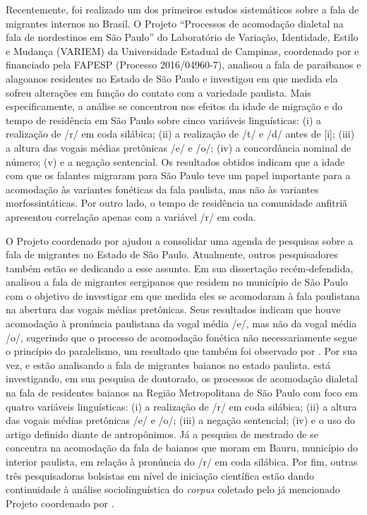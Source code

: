 \documentclass[
	a4paper,	%
	12pt,		%
	]{article}	%
\begin{document}
Recentemente, foi realizado um dos primeiros estudos sistemáticos sobre a fala
de migrantes internos no Brasil. O Projeto \enquote{Processos de acomodação
dialetal na fala de nordestinos em São Paulo} do Laboratório de Variação,
Identidade, Estilo e Mudança (VARIEM) da Universidade Estadual de Campinas,
coordenado por \citet{Oushiro2018} e financiado pela FAPESP (Processo
2016/04960-7), analisou a fala de paraibanos e alagoanos residentes no Estado de
São Paulo e investigou em que medida ela sofreu alterações em função do contato
com a variedade paulista.  Mais especificamente, a análise se concentrou nos
efeitos da idade de migração e do tempo de residência em São Paulo sobre cinco
variáveis linguísticas: (i) a realização de /r/ em coda silábica; (ii) a
realização de /t/ e /d/ antes de [i]; (iii) a altura das vogais médias
pretônicas /e/ e /o/; (iv) a concordância nominal de número; (v) e a negação
sentencial. Os resultados obtidos indicam que a idade com que os falantes
migraram para São Paulo teve um papel importante para a acomodação às variantes
fonéticas da fala paulista, mas não às variantes morfossintáticas. Por outro
lado, o tempo de residência na comunidade anfitriã apresentou correlação apenas
com a variável /r/ em coda.

O Projeto coordenado por \citet{Oushiro2018} ajudou a consolidar uma agenda
de pesquisas sobre a fala de migrantes no Estado de São Paulo. Atualmente,
outros pesquisadores também estão se dedicando a esse assunto. Em sua
dissertação recém-defendida, \citet{Santana2019} analisou a fala de
migrantes sergipanos que residem no município de São Paulo com o objetivo de
investigar em que medida eles se acomodaram à fala paulistana na abertura
das vogais médias pretônicas.  Seus resultados indicam que houve acomodação
à pronúncia paulistana da vogal média /e/, mas não da vogal média /o/,
sugerindo que o processo de acomodação fonética não necessariamente segue o
princípio do paralelismo, um resultado que também foi observado por
\citet{Oushiro2019}. Por sua vez, \citet{Souza2017} e \citet{Oliveira2019}
estão analisando a fala de migrantes baianos no estado paulista.
\citet{Souza2017} está investigando, em sua pesquisa de doutorado, os
processos de acomodação dialetal na fala de residentes baianos na Região
Metropolitana de São Paulo com foco em quatro variáveis linguísticas: (i) a
realização de /r/ em coda silábica; (ii) a altura das vogais médias
pretônicas /e/ e /o/; (iii) a negação sentencial; (iv) e o uso do artigo
definido diante de antropônimos. Já a pesquisa de mestrado de
\citet{Oliveira2019} se concentra na acomodação da fala de baianos que moram
em Bauru, município do interior paulista, em relação à pronúncia do /r/ em
coda silábica. Por fim, outras três pesquisadoras bolsistas em nível de
iniciação científica estão dando continuidade à análise sociolinguística do
\emph{corpus} coletado pelo já mencionado Projeto coordenado por
\citet{Oushiro2018}.
\end{document}
